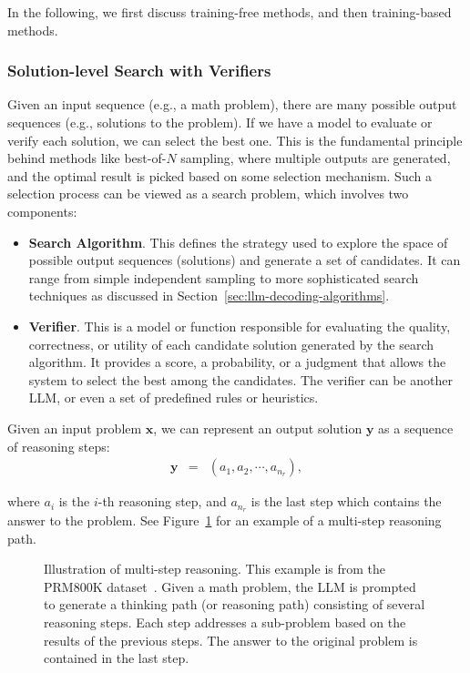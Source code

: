 In the following, we first discuss training-free methods, and then training-based methods.

\subsubsection{Solution-level Search with Verifiers}

Given an input sequence (e.g., a math problem), there are many possible output sequences (e.g., solutions to the problem). If we have a model to evaluate or verify each solution, we can select the best one. This is the fundamental principle behind methods like best-of-$N$ sampling, where multiple outputs are generated, and the optimal result is picked based on some  selection mechanism. Such a selection process can be viewed as a search problem, which involves two components:

\begin{itemize}
\item \vspace{0.5em} \textbf{Search Algorithm}. This defines the strategy used to explore the space of possible output sequences (solutions) and generate a set of candidates. It can range from simple independent sampling to more sophisticated search techniques as discussed in Section~\ref{sec:llm-decoding-algorithms}.
\item \vspace{0.3em} \textbf{Verifier}.  This is a model or function responsible for evaluating the quality, correctness, or utility of each candidate solution generated by the search algorithm. It provides a score, a probability, or a judgment that allows the system to select the best among the candidates. The verifier can be another LLM, or even a set of predefined rules or heuristics.
\end{itemize}
\vspace{0.5em}

Given an input problem $\mathbf{x}$, we can represent an output solution $\mathbf{y}$ as a sequence of reasoning steps:
\begin{eqnarray}
\mathbf{y} & = & (a_1,a_2,\cdots,a_{n_r}),
\end{eqnarray}

\noindent where $a_i$ is the $i$-th reasoning step, and $a_{n_r}$ is the last step which contains the answer to the problem. See Figure~\ref{fig:multi-step-reasoning-example} for an example of a multi-step reasoning path.

\begin{figure}[!t]
\centering

\vspace{-0.5cm} \caption{Illustration of multi-step reasoning. This example is from the PRM800K dataset~\cite{lightman-etal:2024lets}. Given a math problem, the LLM is prompted to generate a thinking path (or reasoning path) consisting of several reasoning steps. Each step addresses a sub-problem based on the results of the previous steps. The answer to the original problem is contained in the last step.}
\label{fig:multi-step-reasoning-example}
\end{figure}

